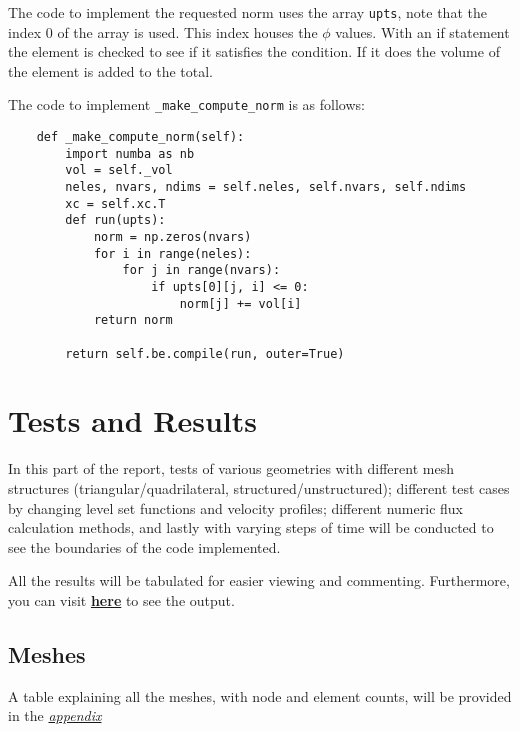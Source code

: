 \documentclass[a4paper, 12pt]{article}
\begin{document}
The code to implement the requested norm uses the array \verb|upts|, note that the index 0 of the array is used. This index houses the $\phi$ values. With an if statement the element is checked to see if it satisfies the condition. If it does the volume of the element is added to the total.  \\\par

The code to implement \verb|_make_compute_norm| is as follows:

\begin{verbatim}
    def _make_compute_norm(self):
        import numba as nb
        vol = self._vol
        neles, nvars, ndims = self.neles, self.nvars, self.ndims
        xc = self.xc.T   
        def run(upts):
            norm = np.zeros(nvars)
            for i in range(neles):
                for j in range(nvars):
                    if upts[0][j, i] <= 0:
                        norm[j] += vol[i]
            return norm

        return self.be.compile(run, outer=True)
\end{verbatim}


\section{Tests and Results}

In this part of the report, tests of various geometries with different mesh structures (triangular/quadrilateral, structured/unstructured); different test cases by changing level set functions and velocity profiles; different numeric flux calculation methods, and lastly with varying steps of time will be conducted to see the boundaries of the code implemented.\\\par

All the results will be tabulated for easier viewing and commenting. Furthermore, you can visit \href{https://www.baygeldi.com/485_2}{\textbf{here}} to see the output.

\subsection{Meshes}
A table explaining all the meshes, with node and element counts, will be provided in the \hyperref[ap]{\textit{appendix}} \\\par
\end{document}
